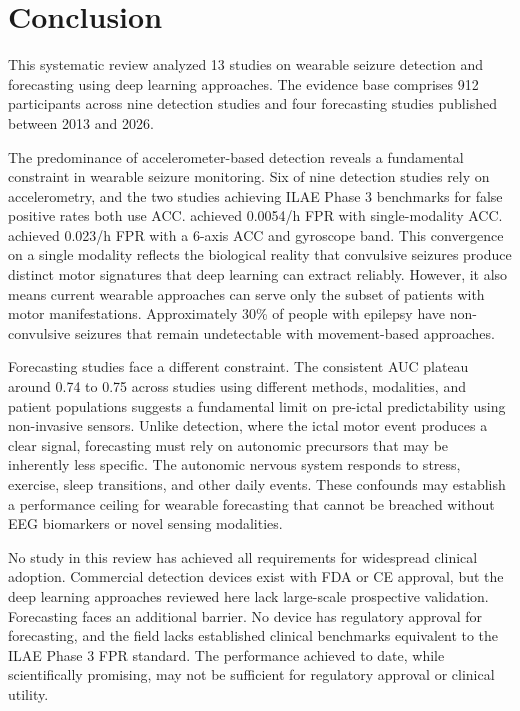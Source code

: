 \section{Conclusion}
\label{sec:conclusion}

This systematic review analyzed 13 studies on wearable seizure detection and forecasting using deep learning approaches. The evidence base comprises 912 participants across nine detection studies and four forecasting studies published between 2013 and 2026.

The predominance of accelerometer-based detection reveals a fundamental constraint in wearable seizure monitoring. Six of nine detection studies rely on accelerometry, and the two studies achieving ILAE Phase 3 benchmarks for false positive rates both use ACC. \textcite{spahrDeepLearningbasedDetection2025} achieved 0.0054/h FPR with single-modality ACC. \textcite{fineDetectionKeyAutomated2025} achieved 0.023/h FPR with a 6-axis ACC and gyroscope band. This convergence on a single modality reflects the biological reality that convulsive seizures produce distinct motor signatures that deep learning can extract reliably. However, it also means current wearable approaches can serve only the subset of patients with motor manifestations. Approximately 30\% of people with epilepsy have non-convulsive seizures that remain undetectable with movement-based approaches.

Forecasting studies face a different constraint. The consistent AUC plateau around 0.74 to 0.75 across studies using different methods, modalities, and patient populations suggests a fundamental limit on pre-ictal predictability using non-invasive sensors. Unlike detection, where the ictal motor event produces a clear signal, forecasting must rely on autonomic precursors that may be inherently less specific. The autonomic nervous system responds to stress, exercise, sleep transitions, and other daily events. These confounds may establish a performance ceiling for wearable forecasting that cannot be breached without EEG biomarkers or novel sensing modalities.

No study in this review has achieved all requirements for widespread clinical adoption. Commercial detection devices exist with FDA or CE approval, but the deep learning approaches reviewed here lack large-scale prospective validation. Forecasting faces an additional barrier. No device has regulatory approval for forecasting, and the field lacks established clinical benchmarks equivalent to the ILAE Phase 3 FPR standard. The performance achieved to date, while scientifically promising, may not be sufficient for regulatory approval or clinical utility.

